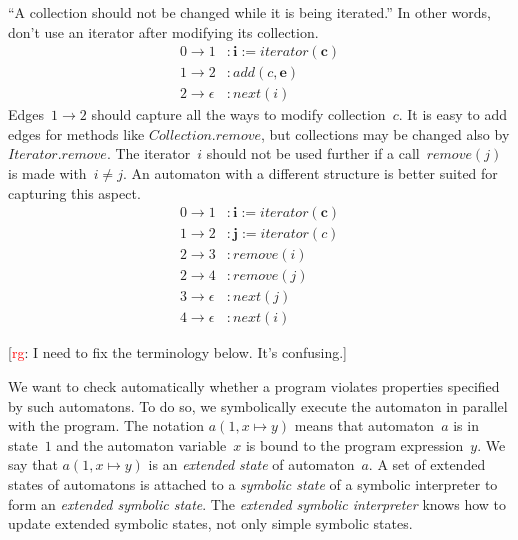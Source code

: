 \documentclass[a4paper]{article}
\newcommand{\rg}[1]{\todo{rg}{#1}}
\newcommand{\todo}[2]{{\small [\textcolor{red}{#1}: #2]}}
\theoremstyle{slanted}
\theoremstyle{definition}
\theoremstyle{remark}
\begin{document}
``A collection should not be changed while it is being iterated.''
In other words, don't use an iterator after modifying its collection.
\begin{equation}\label{eq:iter1}
\begin{aligned}
0\to1&: \mathbf{i} := \mathit{iterator}(\mathbf{c})\\
1\to2&: \mathit{add}(c, \mathbf{e}) \\
2\to\epsilon&: \mathit{next}(i)
\end{aligned}
\end{equation}
Edges~$1\to2$ should capture all the ways to modify collection~$c$.
It is easy to add edges for methods like $\mathit{Collection}.\mathit{remove}$, but collections may be changed also by $\mathit{Iterator}.\mathit{remove}$.
The iterator~$i$ should not be used further if a call~$\mathit{remove}(j)$ is made with~$i\ne j$.
An automaton with a different structure is better suited for capturing this aspect.
\begin{equation}\label{eq:iter2}
\begin{aligned}
0\to1&: \mathbf{i} := \mathit{iterator}(\mathbf{c})\\
1\to2&: \mathbf{j} := \mathit{iterator}(c)\\
2\to3&: \mathit{remove}(i)\\
2\to4&: \mathit{remove}(j)\\
3\to\epsilon&: \mathit{next}(j)\\
4\to\epsilon&: \mathit{next}(i)
\end{aligned}
\end{equation}

\rg{I need to fix the terminology below. It's confusing.}

We want to check automatically whether a program violates properties specified by such automatons.
To do so, we symbolically execute the automaton in parallel with the program.
The notation $a(1, x\mapsto y)$ means that automaton~$a$ is in state~$1$ and the automaton variable~$x$ is bound to the program expression~$y$.
We say that $a(1,x\mapsto y)$ is an \emph{extended state} of automaton~$a$.
A set of extended states of automatons is attached to a \emph{symbolic state} of a symbolic interpreter to form an \emph{extended symbolic state}.
The \emph{extended symbolic interpreter} knows how to update extended symbolic states, not only simple symbolic states.
\end{document}
